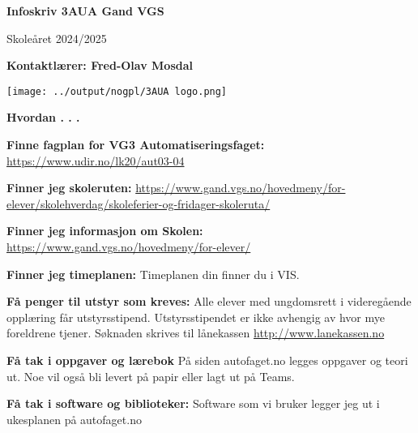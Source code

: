 \documentclass[12pt,a4paper]{article}
\begin{document}
\begin{titlepage}
   \begin{center}
       \vspace*{1cm}

       \textbf{Infoskriv 3AUA Gand VGS}

       \vspace{0.5cm}
        Skoleåret 2024/2025
            
       \vspace{1.5cm}

       \textbf{Kontaktlærer: Fred-Olav Mosdal}

       \vfill
            
            
     
       \texttt{[image: ../output/nogpl/3AUA logo.png]}
    \vfill        
            
   \end{center}
\end{titlepage}


\centerline{\bf Hvordan . . .} \bigskip 

\noindent
{\bf Finne fagplan for VG3 Automatiseringsfaget:} \url{https://www.udir.no/lk20/aut03-04}
\vskip 10pt

\noindent
{\bf Finner jeg skoleruten:} \url{https://www.gand.vgs.no/hovedmeny/for-elever/skolehverdag/skoleferier-og-fridager-skoleruta/}
\vskip 10pt

\noindent
{\bf Finner jeg informasjon om Skolen:} \url{https://www.gand.vgs.no/hovedmeny/for-elever/}
\vskip 10pt

\noindent
{\bf Finner jeg timeplanen:} Timeplanen din finner du i VIS. 
\vskip 10pt

\noindent
{\bf Få penger til utstyr som kreves:} Alle elever med ungdomsrett i videregående opplæring får utstyrsstipend. Utstyrsstipendet er ikke avhengig av hvor mye foreldrene tjener.
Søknaden skrives til lånekassen \url{http://www.lanekassen.no}
\vskip 10pt

\noindent
{\bf Få tak i oppgaver og lærebok} På siden autofaget.no legges oppgaver og teori ut. Noe vil også bli levert på papir eller lagt ut på Teams. 
\vskip 10pt

\noindent
{\bf Få tak i  software og biblioteker:} Software som vi bruker legger jeg ut i ukesplanen på autofaget.no  
\vskip 10pt
\end{document}
